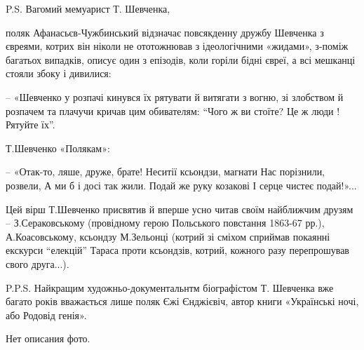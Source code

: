 \begin{itemize}
P.S. Вагомий мемуарист Т. Шевченка,

поляк Афанасьєв-Чужбинський відзначає повсякденну дружбу Шевченка з євреями,
котрих він ніколи не ототожнював з ідеологічними «жидами», з-поміж багатьох
випадків, описує один з епізодів, коли горіли бідні євреї, а всі мешканці
стояли збоку і дивилися:

– «Шевченко у розпачі кинувся їх рятувати й витягати з вогню, зі злобством й
розпачем та плачучи кричав цим обивателям: \enquote{Чого ж ви стоїте? Це ж люди !
Рятуйте їх}.

Т.Шевченко «Полякам»:

\obeycr
– «Отак-то, ляше, друже, брате!
Неситії ксьондзи, магнати
Нас порізнили, розвели,
А ми б і досі так жили.
Подай же руку козакові
І серце чистеє подай!»...
\restorecr

Цей вірш Т.Шевченко присвятив й вперше усно читав своїм найближчим друзям –
З.Сераковському (провідному герою Польського повстання 1863-67 рр.),
А.Коасовському, ксьондзу М.Зельонці (котрий зі сміхом сприймав покаянні
екскурси \enquote{елекцій} Тараса проти ксьондзів, котрий, кожного разу перепрошував
свого друга...).

P.P.S. Найкращим художньо-документальнтм біографістом Т. Шевченка вже багато
років вважається лише поляк Єжі Єнджієвіч, автор книги «Українські ночі, або
Родовід генія».

Нет описания фото.

\end{itemize} %
